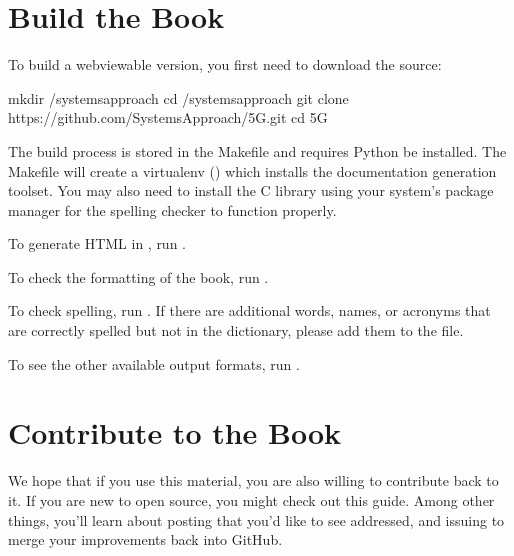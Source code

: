 \documentclass[a4paper,11pt,english]{sphinxmanual}
\begin{document}
\section{Build the Book}
\label{\detokenize{README:build-the-book}}
\sphinxAtStartPar
To build a web\sphinxhyphen{}viewable version, you first need to download the source:

\begin{sphinxVerbatim}[commandchars=\\\{\}]
\PYGZdl{} mkdir \PYGZti{}/systemsapproach 
\PYGZdl{} cd \PYGZti{}/systemsapproach 
\PYGZdl{} git clone https://github.com/SystemsApproach/5G.git 
\PYGZdl{} cd 5G
\end{sphinxVerbatim}

\sphinxAtStartPar
The build process is stored in the Makefile and requires Python be
installed. The Makefile will create a virtualenv () which
installs the documentation generation toolset. You may also need to
install the  C library using your system’s package manager
for the spelling checker to function properly.

\sphinxAtStartPar
To generate HTML in ,  run .

\sphinxAtStartPar
To check the formatting of the book, run .

\sphinxAtStartPar
To check spelling, run . If there are additional
words, names, or acronyms that are correctly spelled but not in the dictionary,
please add them to the  file.

\sphinxAtStartPar
To see the other available output formats, run .


\section{Contribute to the Book}
\label{\detokenize{README:contribute-to-the-book}}
\sphinxAtStartPar
We hope that if you use this material, you are also willing to
contribute back to it. If you are new to open source, you might check
out this  guide. Among
other things, you’ll learn about posting  that you’d like to see
addressed, and issuing  to merge your improvements back
into GitHub.
\end{document}
